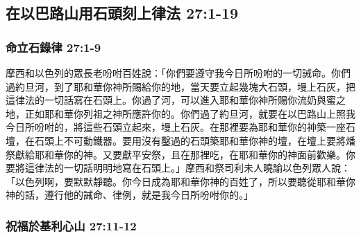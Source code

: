 \subsection{在以巴路山用石頭刻上律法 27:1-19 }
\subsubsection{命立石錄律 27:1-9}
摩西和以色列的眾長老吩咐百姓說：「你們要遵守我今日所吩咐的一切誡命。你們過約旦河，到了耶和華你神所賜給你的地，當天要立起幾塊大石頭，墁上石灰，把這律法的一切話寫在石頭上。你過了河，可以進入耶和華你神所賜你流奶與蜜之地，正如耶和華你列祖之神所應許你的。你們過了約旦河，就要在以巴路山上照我今日所吩咐的，將這些石頭立起來，墁上石灰。在那裡要為耶和華你的神築一座石壇，在石頭上不可動鐵器。要用沒有鑿過的石頭築耶和華你神的壇，在壇上要將燔祭獻給耶和華你的神。又要獻平安祭，且在那裡吃，在耶和華你的神面前歡樂。你要將這律法的一切話明明地寫在石頭上。」摩西和祭司利未人曉諭以色列眾人說：「以色列啊，要默默靜聽。你今日成為耶和華你神的百姓了，所以要聽從耶和華你神的話，遵行他的誡命、律例，就是我今日所吩咐你的。」


\subsubsection{祝福於基利心山 27:11-12}


